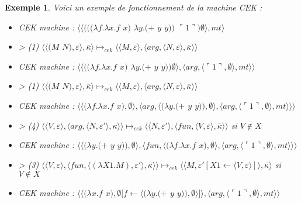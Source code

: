 \documentclass[10pt,a4paper]{report}
\newtheorem{ex}{Exemple}
\begin{document}
	
	
	\begin{ex}\label{CEK} Voici un exemple de fonctionnement de la machine CEK :
		\medbreak
		
		\begin{itemize}
			\item[] CEK machine : $\langle\langle(((\lambda f.\lambda x.f$ $x)$ $\lambda y.(+$ $y$ $y))$ $\ulcorner 1\urcorner)\emptyset\rangle,mt\rangle$
			\item[] > (1) $\langle\langle(M$ $N),\varepsilon\rangle,\overline{\kappa}\rangle \longmapsto_{cek} \langle \langle M,\varepsilon\rangle,\langle arg,\langle N,\varepsilon\rangle,\overline{\kappa}\rangle\rangle$
			\item[] CEK machine : $\langle\langle((\lambda f.\lambda x.f$ $x)$ $\lambda y.(+$ $y$ $y))\emptyset\rangle,\langle arg,\langle\ulcorner 1\urcorner,\emptyset\rangle,mt\rangle\rangle$
			\item[] > (1) $\langle\langle(M$ $N),\varepsilon\rangle,\overline{\kappa}\rangle \longmapsto_{cek} \langle \langle M,\varepsilon\rangle,\langle arg,\langle N,\varepsilon\rangle,\overline{\kappa}\rangle\rangle$
			\item[] CEK machine : $\langle\langle(\lambda f.\lambda x.f$ $x),\emptyset\rangle,\langle arg,\langle(\lambda y.(+$ $y$ $y)),\emptyset\rangle,\langle arg,\langle\ulcorner 1\urcorner,\emptyset\rangle,mt\rangle\rangle\rangle$
			\item[] > (4) $\langle \langle V,\varepsilon\rangle,\langle arg,\langle N,\varepsilon'\rangle,\kappa\rangle\rangle \longmapsto_{cek} \langle \langle N,\varepsilon'\rangle,\langle fun,\langle V,\varepsilon\rangle,\overline{\kappa}\rangle\rangle$ si $V \notin X$
			\item[] CEK machine : $\langle\langle(\lambda y.(+$ $y$ $y)),\emptyset\rangle,\langle fun,\langle(\lambda f.\lambda x.f$ $x),\emptyset\rangle,\langle arg,\langle\ulcorner 1\urcorner,\emptyset\rangle,mt\rangle\rangle\rangle$
			\item[] > (3) $\langle\langle V,\varepsilon\rangle,\langle fun,\langle (\lambda X1.M),\varepsilon'\rangle,\overline{\kappa} \rangle \rangle \longmapsto_{cek} \langle \langle M,\varepsilon'[X1 \leftarrow \langle V,\varepsilon\rangle]\rangle,\overline{\kappa}\rangle$ si $V \notin X$
			\item[] CEK machine : $\langle\langle(\lambda x.f$ $x),\emptyset[f \leftarrow \langle(\lambda y.(+$ $y$ $y)),\emptyset\rangle]\rangle,\langle arg,\langle\ulcorner 1\urcorner,\emptyset\rangle,mt\rangle\rangle$

\end{itemize}
\end{ex}
\end{document}
